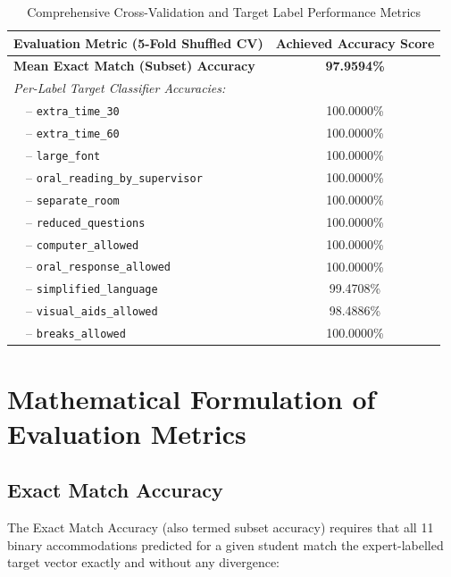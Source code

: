 \documentclass[12pt,a4paper]{report}
\begin{document}
\begin{table}[H]
  \centering
  \small
  \caption{Comprehensive Cross-Validation and Target Label Performance Metrics}
  \label{tab:model_metrics}
  \vspace{0.3cm}
  \begin{tabular}{lc}
    \toprule
    \textbf{Evaluation Metric (5-Fold Shuffled CV)} & \textbf{Achieved Accuracy Score} \\
    \midrule
    \textbf{Mean Exact Match (Subset) Accuracy} & \textbf{97.9594\%} \\
    \midrule
    \textit{Per-Label Target Classifier Accuracies:} & \\
    \ \ -- \texttt{extra\_time\_30} & 100.0000\% \\
    \ \ -- \texttt{extra\_time\_60} & 100.0000\% \\
    \ \ -- \texttt{large\_font} & 100.0000\% \\
    \ \ -- \texttt{oral\_reading\_by\_supervisor} & 100.0000\% \\
    \ \ -- \texttt{separate\_room} & 100.0000\% \\
    \ \ -- \texttt{reduced\_questions} & 100.0000\% \\
    \ \ -- \texttt{computer\_allowed} & 100.0000\% \\
    \ \ -- \texttt{oral\_response\_allowed} & 100.0000\% \\
    \ \ -- \texttt{simplified\_language} & 99.4708\% \\
    \ \ -- \texttt{visual\_aids\_allowed} & 98.4886\% \\
    \ \ -- \texttt{breaks\_allowed} & 100.0000\% \\
    \bottomrule
  \end{tabular}
\end{table}


\section{Mathematical Formulation of Evaluation Metrics}

\subsection{Exact Match Accuracy}

The Exact Match Accuracy (also termed subset accuracy) requires that all 11 binary accommodations predicted for a given student match the expert-labelled target vector exactly and without any divergence:
\end{document}
